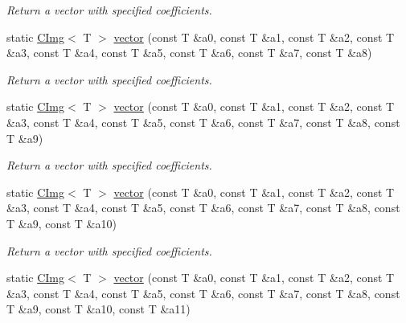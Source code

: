 \begin{DoxyCompactItemize}
\begin{DoxyCompactList}\small\item\em Return a vector with specified coefficients. \item\end{DoxyCompactList}\item 
\hypertarget{structcimg__library_1_1CImg_aad82caec44604bd51a286afbb1bb2e89}{
static \hyperlink{structcimg__library_1_1CImg}{CImg}$<$ T $>$ \hyperlink{structcimg__library_1_1CImg_aad82caec44604bd51a286afbb1bb2e89}{vector} (const T \&a0, const T \&a1, const T \&a2, const T \&a3, const T \&a4, const T \&a5, const T \&a6, const T \&a7, const T \&a8)}
\label{structcimg__library_1_1CImg_aad82caec44604bd51a286afbb1bb2e89}

\begin{DoxyCompactList}\small\item\em Return a vector with specified coefficients. \item\end{DoxyCompactList}\item 
\hypertarget{structcimg__library_1_1CImg_aef996c8c7d9f3c76dce7c47cb955a6d6}{
static \hyperlink{structcimg__library_1_1CImg}{CImg}$<$ T $>$ \hyperlink{structcimg__library_1_1CImg_aef996c8c7d9f3c76dce7c47cb955a6d6}{vector} (const T \&a0, const T \&a1, const T \&a2, const T \&a3, const T \&a4, const T \&a5, const T \&a6, const T \&a7, const T \&a8, const T \&a9)}
\label{structcimg__library_1_1CImg_aef996c8c7d9f3c76dce7c47cb955a6d6}

\begin{DoxyCompactList}\small\item\em Return a vector with specified coefficients. \item\end{DoxyCompactList}\item 
\hypertarget{structcimg__library_1_1CImg_a38a14e7ac3c7f0c48f595a7473f61a08}{
static \hyperlink{structcimg__library_1_1CImg}{CImg}$<$ T $>$ \hyperlink{structcimg__library_1_1CImg_a38a14e7ac3c7f0c48f595a7473f61a08}{vector} (const T \&a0, const T \&a1, const T \&a2, const T \&a3, const T \&a4, const T \&a5, const T \&a6, const T \&a7, const T \&a8, const T \&a9, const T \&a10)}
\label{structcimg__library_1_1CImg_a38a14e7ac3c7f0c48f595a7473f61a08}

\begin{DoxyCompactList}\small\item\em Return a vector with specified coefficients. \item\end{DoxyCompactList}\item 
\hypertarget{structcimg__library_1_1CImg_a288a8040101bdfd97d65709e34b17017}{
static \hyperlink{structcimg__library_1_1CImg}{CImg}$<$ T $>$ \hyperlink{structcimg__library_1_1CImg_a288a8040101bdfd97d65709e34b17017}{vector} (const T \&a0, const T \&a1, const T \&a2, const T \&a3, const T \&a4, const T \&a5, const T \&a6, const T \&a7, const T \&a8, const T \&a9, const T \&a10, const T \&a11)}
\label{structcimg__library_1_1CImg_a288a8040101bdfd97d65709e34b17017}


\end{DoxyCompactItemize}
